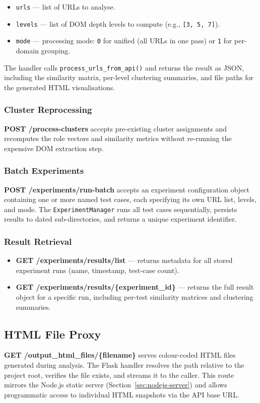 \begin{itemize}
    \item \texttt{urls} --- list of URLs to analyse.
    \item \texttt{levels} --- list of DOM depth levels to compute (e.g., \texttt{[3, 5, 7]}).
    \item \texttt{mode} --- processing mode: \texttt{0} for unified (all URLs in one pass) or \texttt{1} for per-domain grouping.
\end{itemize}

The handler calls \texttt{process\_urls\_from\_api()} and returns the result as JSON, including the similarity matrix, per-level clustering summaries, and file paths for the generated HTML visualisations.

\subsubsection{Cluster Reprocessing}
\textbf{POST /process-clusters} accepts pre-existing cluster assignments and recomputes the role vectors and similarity metrics without re-running the expensive DOM extraction step.

\subsubsection{Batch Experiments}
\textbf{POST /experiments/run-batch} accepts an experiment configuration object containing one or more named test cases, each specifying its own URL list, levels, and mode. The \texttt{ExperimentManager} runs all test cases sequentially, persists results to dated sub-directories, and returns a unique experiment identifier.

\subsubsection{Result Retrieval}
\begin{itemize}
    \item \textbf{GET /experiments/results/list} --- returns metadata for all stored experiment runs (name, timestamp, test-case count).
    \item \textbf{GET /experiments/results/\{experiment\_id\}} --- returns the full result object for a specific run, including per-test similarity matrices and clustering summaries.
\end{itemize}

\subsection{HTML File Proxy}
\textbf{GET /output\_html\_files/\{filename\}} serves colour-coded HTML files generated during analysis. The Flask handler resolves the path relative to the project root, verifies the file exists, and streams it to the caller. This route mirrors the Node.js static server (Section~\ref{sec:nodejs-server}) and allows programmatic access to individual HTML snapshots via the API base URL.


